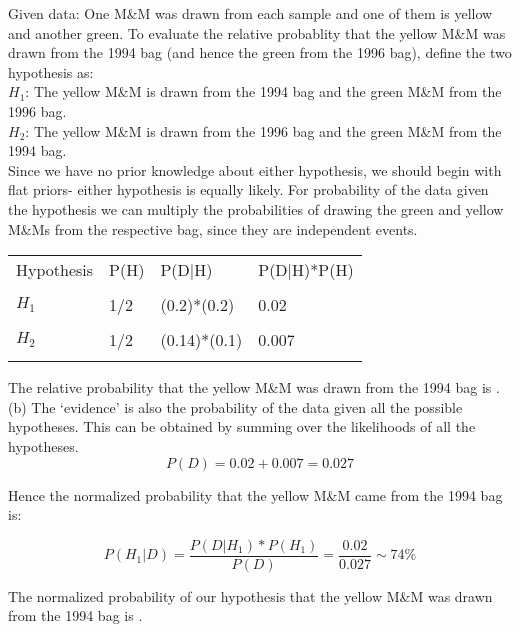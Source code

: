 \documentclass[12pt,usletter,english]{article}
\begin{document}
Given data: One M\&M was drawn from each sample and one of them is
yellow and another green. To evaluate the relative probablity that the
yellow M\&M was drawn from the 1994 bag (and hence the green from the
1996 bag), define the two hypothesis as:\\
$H_1$: The yellow M\&M is drawn from the 1994 bag and the green M\&M from the
1996 bag.\\
$H_2$: The yellow M\&M is drawn from the 1996 bag and the green M\&M from the
1994 bag.\\

Since we have no prior knowledge about either hypothesis, we should
begin with flat priors- either hypothesis is equally likely. For
probability of the data given the hypothesis we can multiply the
probabilities of drawing the green and yellow M\&Ms from the
respective bag, since they are independent events.

\begin{center}
\begin{tabular}{|l|l|l|l|}
\hline
Hypothesis & P(H) & P(D$|$H) & P(D$|$H)*P(H) \\
 & & & \\
\hline
$H_1$ & 1/2 & (0.2)*(0.2) & 0.02 \\
 & & & \\
\hline
$H_2$ & 1/2 & (0.14)*(0.1) & 0.007 \\
 & & & \\
\hline
\end{tabular}
\end{center}

The relative probability that the yellow M\&M was drawn from the 1994
bag is .\\

(b) The `evidence' is also the probability of the data given all the
possible hypotheses. This can be obtained by summing over the
likelihoods of all the hypotheses.
\begin{equation}
  P(D) = 0.02+0.007 = 0.027
\end{equation}

Hence the normalized probability that the yellow M\&M came from the
1994 bag is:

\begin{equation}
  P(H_1|D) = \frac{P(D|H_1)*P(H_1)}{P(D)} = \frac{0.02}{0.027} \sim 74\%
\end{equation}

The normalized probability of our hypothesis that the yellow M\&M was
drawn from the 1994 bag is .
\end{document}
